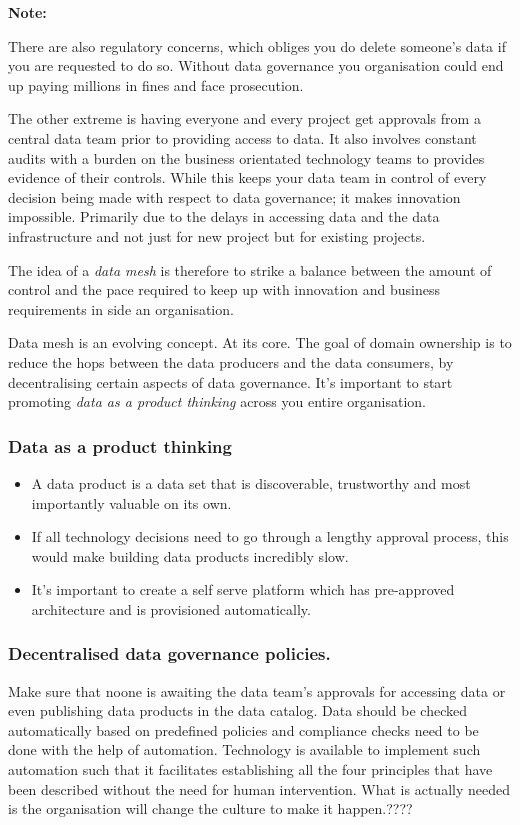 \documentclass[a4paper, 11pt]{book}
\newenvironment{note}{
    \begin{siderule}
        \textbf{Note: }
        }{
    \end{siderule}}
\begin{document}
    \begin{note}
        There are also regulatory concerns, which obliges you do delete someone's data if you are requested to do so.
        Without data governance you organisation could end up paying millions in fines and face prosecution.
    \end{note}
    The other extreme is having everyone and every project get approvals from a central data team prior to providing access to data.
    It also involves constant audits with a burden on the business orientated technology teams to provides evidence of their controls.
    While this keeps your data team in control of every decision being made with respect to data governance; it makes innovation impossible.
    Primarily due to the delays in accessing data and the data infrastructure and not just for new project but for existing projects.

    The idea of a \textit{data mesh} is therefore to strike a balance between the amount of control and the pace required to keep up with innovation and business requirements in side an organisation.

    Data mesh is an evolving concept.
    At its core.
    The goal of domain ownership is to reduce the hops between the data producers and the data consumers, by decentralising certain aspects of data governance.
    It's important to start promoting \textit{data as a product thinking} across you entire organisation.

    \subsubsection{Data as a product thinking}
    \begin{itemize}
        \item A data product is a data set that is discoverable, trustworthy and most importantly valuable on its own.
        \item If all technology decisions need to go through a lengthy approval process, this would make building data products incredibly slow.
        \item It's important to create a self serve platform which has pre-approved architecture and is provisioned automatically.
    \end{itemize}

    \subsubsection{Decentralised data governance policies.}
    Make sure that noone is awaiting the data team's approvals for accessing data or even publishing data products in the data catalog.
    Data should be checked automatically based on predefined policies and compliance checks need to be done with the help of automation.
    Technology is available to implement such automation such that it facilitates establishing all the four principles that have been described without the need for human intervention.
    What is actually needed is the organisation will change the culture to make it happen.????
\end{document}
